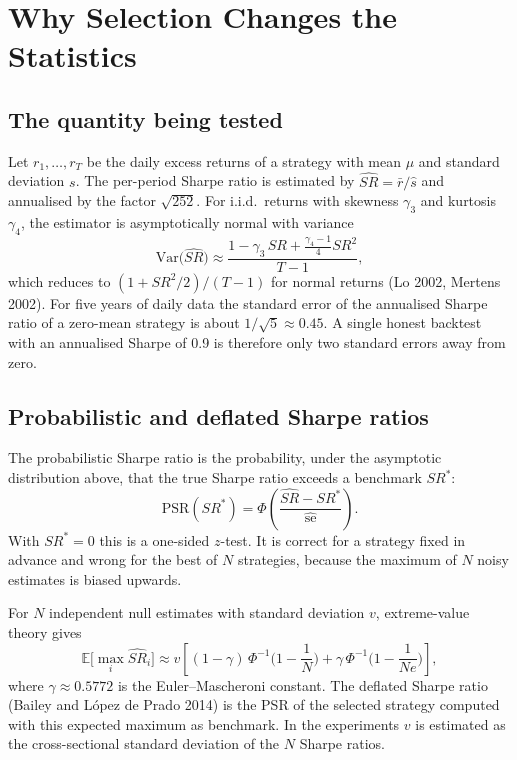 \documentclass[11pt,a4paper,oneside]{report}
\begin{document}
\tableofcontents

\chapter{Why Selection Changes the Statistics}

\section{The quantity being tested}
Let $r_1,\dots,r_T$ be the daily excess returns of a strategy with mean $\mu$ and standard deviation $s$. The per-period Sharpe ratio is estimated by $\widehat{SR}=\bar r/\hat s$ and annualised by the factor $\sqrt{252}$. For i.i.d.\ returns with skewness $\gamma_3$ and kurtosis $\gamma_4$, the estimator is asymptotically normal with variance
\begin{equation}\label{eq:var}
\mathrm{Var}\big(\widehat{SR}\big)\approx\frac{1-\gamma_3\,SR+\frac{\gamma_4-1}{4}SR^2}{T-1},
\end{equation}
which reduces to $(1+SR^2/2)/(T-1)$ for normal returns (Lo 2002, Mertens 2002). For five years of daily data the standard error of the annualised Sharpe ratio of a zero-mean strategy is about $1/\sqrt 5\approx0.45$. A single honest backtest with an annualised Sharpe of 0.9 is therefore only two standard errors away from zero.

\section{Probabilistic and deflated Sharpe ratios}
The probabilistic Sharpe ratio is the probability, under the asymptotic distribution above, that the true Sharpe ratio exceeds a benchmark $SR^*$:
\begin{equation}
\mathrm{PSR}(SR^*) = \Phi\!\left(\frac{\widehat{SR}-SR^*}{\widehat{\mathrm{se}}}\right).
\end{equation}
With $SR^*=0$ this is a one-sided $z$-test. It is correct for a strategy fixed in advance and wrong for the best of $N$ strategies, because the maximum of $N$ noisy estimates is biased upwards.

For $N$ independent null estimates with standard deviation $v$, extreme-value theory gives
\begin{equation}\label{eq:emax}
\mathbb E\big[\max_i \widehat{SR}_i\big]\approx v\left[(1-\gamma)\,\Phi^{-1}\!\Big(1-\frac1N\Big)+\gamma\,\Phi^{-1}\!\Big(1-\frac1{Ne}\Big)\right],
\end{equation}
where $\gamma\approx0.5772$ is the Euler--Mascheroni constant. The deflated Sharpe ratio (Bailey and López de Prado 2014) is the PSR of the selected strategy computed with this expected maximum as benchmark. In the experiments $v$ is estimated as the cross-sectional standard deviation of the $N$ Sharpe ratios.
\end{document}

